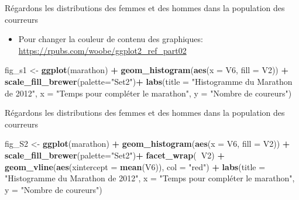 \documentclass[ignorenonframetext,]{beamer}
\newenvironment{Shaded}{\begin{snugshade}}{\end{snugshade}}
\newcommand{\KeywordTok}[1]{\textcolor[rgb]{0.13,0.29,0.53}{\textbf{#1}}}
\newcommand{\DataTypeTok}[1]{\textcolor[rgb]{0.13,0.29,0.53}{#1}}
\newcommand{\StringTok}[1]{\textcolor[rgb]{0.31,0.60,0.02}{#1}}
\newcommand{\OperatorTok}[1]{\textcolor[rgb]{0.81,0.36,0.00}{\textbf{#1}}}
\newcommand{\NormalTok}[1]{#1}
\providecommand{\tightlist}{%
  \setlength{\itemsep}{0pt}\setlength{\parskip}{0pt}}
\begin{document}
\begin{frame}[fragile]{Régardons les distributions des femmes et des
hommes dans la population des courreurs}

\begin{itemize}
\tightlist
\item
  Pour changer la couleur de contenu des graphiques:
  \url{https://rpubs.com/woobe/ggplot2_ref_part02}
\end{itemize}

\begin{Shaded}
\begin{Highlighting}[]
\NormalTok{fig_s1 <-}
\StringTok{  }\KeywordTok{ggplot}\NormalTok{(marathon) }\OperatorTok{+}
\StringTok{  }\KeywordTok{geom_histogram}\NormalTok{(}\KeywordTok{aes}\NormalTok{(}\DataTypeTok{x =}\NormalTok{ V6, }\DataTypeTok{fill =}\NormalTok{ V2)) }\OperatorTok{+}
\StringTok{  }\KeywordTok{scale_fill_brewer}\NormalTok{(}\DataTypeTok{palette=}\StringTok{"Set2"}\NormalTok{)}\OperatorTok{+}\StringTok{ }
\StringTok{  }\KeywordTok{labs}\NormalTok{(}\DataTypeTok{title =} \StringTok{"Histogramme du Marathon de 2012"}\NormalTok{,}
       \DataTypeTok{x =} \StringTok{"Temps pour compléter le marathon"}\NormalTok{,}
       \DataTypeTok{y =} \StringTok{"Nombre de coureurs"}\NormalTok{)}
\end{Highlighting}
\end{Shaded}

\end{frame}

\begin{frame}[fragile]{Régardons les distributions des femmes et des
hommes dans la population des courreurs}

\begin{Shaded}
\begin{Highlighting}[]
\NormalTok{fig_S2 <-}
\StringTok{  }\KeywordTok{ggplot}\NormalTok{(marathon) }\OperatorTok{+}
\StringTok{  }\KeywordTok{geom_histogram}\NormalTok{(}\KeywordTok{aes}\NormalTok{(}\DataTypeTok{x =}\NormalTok{ V6, }\DataTypeTok{fill =}\NormalTok{ V2)) }\OperatorTok{+}
\StringTok{  }\KeywordTok{scale_fill_brewer}\NormalTok{(}\DataTypeTok{palette=}\StringTok{"Set2"}\NormalTok{)}\OperatorTok{+}\StringTok{ }
\StringTok{  }\KeywordTok{facet_wrap}\NormalTok{(}\OperatorTok{~}\NormalTok{V2) }\OperatorTok{+}
\StringTok{  }\KeywordTok{geom_vline}\NormalTok{(}\KeywordTok{aes}\NormalTok{(}\DataTypeTok{xintercept =} \KeywordTok{mean}\NormalTok{(V6)), }\DataTypeTok{col =} \StringTok{"red"}\NormalTok{) }\OperatorTok{+}
\StringTok{  }\KeywordTok{labs}\NormalTok{(}\DataTypeTok{title =} \StringTok{"Histogramme du Marathon de 2012"}\NormalTok{,}
       \DataTypeTok{x =} \StringTok{"Temps pour compléter le marathon"}\NormalTok{,}
       \DataTypeTok{y =} \StringTok{"Nombre de coureurs"}\NormalTok{)}
\end{Highlighting}
\end{Shaded}

\end{frame}
\end{document}
